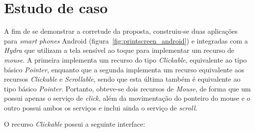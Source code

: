 \section{Estudo de caso}
\label{sec:estudoDeCaso}

A fim de se demonstrar a corretude da proposta, construiu-se duas aplicações para \emph{smart phones} Android (figura~\ref{fig:printscreen_android}) e integradas com a \emph{Hydra} que utilizam a tela sensível ao toque para implementar um recurso de \emph{mouse}. A primeira implementa um recurso do tipo \emph{Clickable}, equivalente ao tipo básico \emph{Pointer}, enquanto que a segunda implementa um recurso equivalente aos recursos \emph{Clickable} e \emph{Scrollable}, sendo que esta última também é equivalente ao tipo básico \emph{Pointer}. Portanto, obteve-se dois recursos de \emph{Mouse}, de forma que um possui apenas o serviço de \emph{click}, além da movimentação do ponteiro do mouse e o outro possui ambos os serviços e inclui ainda o serviço de \emph{scroll}. 

O recurso \emph{Clickable} possui a seguinte interface:

